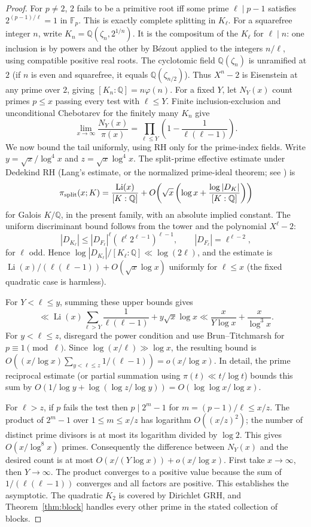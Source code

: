 \documentclass[11pt,letterpaper]{article}
\theoremstyle{definition}\newtheorem{definition}[theorem]{Definition}
\theoremstyle{remark}\newtheorem{remark}[theorem]{Remark}
\newcommand{\Q}{\mathbb Q}\newcommand{\C}{\mathbb C}\newcommand{\R}{\mathbb R}\newcommand{\F}{\mathbb F}\newcommand{\ord}{\operatorname{ord}}\newcommand{\Li}{\operatorname{Li}}\newcommand{\Gal}{\operatorname{Gal}}\newcommand{\Res}{\operatorname{Res}}\newcommand{\ind}{\operatorname{Ind}}\newcommand{\one}{\mathbf 1}
\begin{document}
\begin{proof}
For $p\ne2$, $2$ fails to be a primitive root iff some prime $\ell\mid p-1$ satisfies $2^{(p-1)/\ell}=1$ in $\F_p$. This is exactly complete splitting in $K_\ell$. For a squarefree integer $n$, write $K_n=\Q(\zeta_n,2^{1/n})$. It is the compositum of the $K_\ell$ for $\ell\mid n$: one inclusion is by powers and the other by B\'ezout applied to the integers $n/\ell$, using compatible positive real roots. The cyclotomic field $\Q(\zeta_n)$ is unramified at $2$ (if $n$ is even and squarefree, it equals $\Q(\zeta_{n/2})$). Thus $X^n-2$ is Eisenstein at any prime over $2$, giving $[K_n:\Q]=n\varphi(n)$. For a fixed $Y$, let $N_Y(x)$ count primes $p\le x$ passing every test with $\ell\le Y$. Finite inclusion-exclusion and unconditional Chebotarev for the finitely many $K_n$ give
\[
\lim_{x\to\infty}\frac{N_Y(x)}{\pi(x)}=\prod_{\ell\le Y}\left(1-\frac1{\ell(\ell-1)}\right).
\]
We now bound the tail uniformly, using RH only for the prime-index fields. Write $y=\sqrt{x}/\log^4x$ and $z=\sqrt{x}\log^4x$. The split-prime effective estimate under Dedekind RH (Lang's estimate, or the normalized prime-ideal theorem; see \cite{moree,fan}) is
\[
\pi_{\rm split}(x;K)=\frac{\Li(x)}{[K:\Q]}+O\!\left(\sqrt{x}\left(\log x+\frac{\log|D_K|}{[K:\Q]}\right)\right)
\]
for Galois $K/\Q$, in the present family, with an absolute implied constant. The uniform discriminant bound follows from the tower and the polynomial $X^\ell-2$:
\[
|D_{K_\ell}|\le |D_{F_\ell}|^\ell(\ell^\ell 2^{\ell-1})^{\ell-1},\qquad |D_{F_\ell}|=\ell^{\ell-2},
\]
for $\ell$ odd. Hence $\log |D_{K_\ell}|/[K_\ell:\Q]\ll\log(2\ell)$, and the estimate is $\Li(x)/(\ell(\ell-1))+O(\sqrt x\log x)$ uniformly for $\ell\le x$ (the fixed quadratic case is harmless).

For $Y<\ell\le y$, summing these upper bounds gives
\[
\ll \Li(x)\sum_{\ell>Y}\frac1{\ell(\ell-1)}+y\sqrt{x}\log x
\ll \frac{x}{Y\log x}+\frac{x}{\log^3x}.
\]
For $y<\ell\le z$, disregard the power condition and use Brun--Titchmarsh for $p\equiv1\pmod\ell$. Since $\log(x/\ell)\gg\log x$, the resulting bound is $O((x/\log x)\sum_{y<\ell\le z}1/(\ell-1))=o(x/\log x)$. In detail, the prime reciprocal estimate (or partial summation using $\pi(t)\ll t/\log t$) bounds this sum by $O(1/\log y+\log(\log z/\log y))=O(\log\log x/\log x)$.

For $\ell>z$, if $p$ fails the test then $p\mid 2^m-1$ for $m=(p-1)/\ell\le x/z$. The product of $2^m-1$ over $1\le m\le x/z$ has logarithm $O((x/z)^2)$; the number of distinct prime divisors is at most its logarithm divided by $\log 2$. This gives $O(x/\log^8 x)$ primes. Consequently the difference between $N_Y(x)$ and the desired count is at most $O(x/(Y\log x))+o(x/\log x)$. First take $x\to\infty$, then $Y\to\infty$. The product converges to a positive value because the sum of $1/(\ell(\ell-1))$ converges and all factors are positive. This establishes the asymptotic. The quadratic $K_2$ is covered by Dirichlet GRH, and Theorem~\ref{thm:block} handles every other prime in the stated collection of blocks.
\end{proof}
\end{document}
